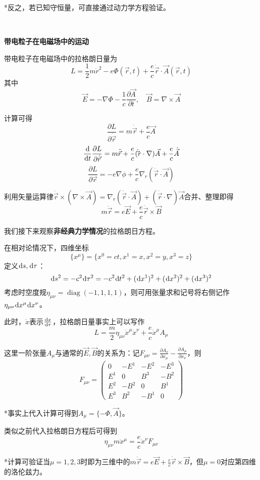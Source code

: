\documentclass[a4paper,UTF8,fontset=windows]{ctexart}
\newcommand*{\dr}{\hspace{0.07em}\mathrm{d}}
\DeclareMathOperator{\diag}{diag}
\begin{document}
*反之，若已知守恒量，可直接通过动力学方程验证。

\

\textbf{带电粒子在电磁场中的运动}

带电粒子在电磁场中的拉格朗日量为
$$L=\frac{1}{2}m\dot{r}^2-e\Phi(\vec{r},t)+\frac{e}{c}\dot{\vec{r}}\cdot\vec{A}(\vec{r},t)$$
其中
$$\vec{E}=-\nabla\Phi-\frac{1}{c}\frac{\partial\vec{A}}{\partial t},\quad\vec{B}=\nabla\times\vec{A}$$

计算可得
$$\frac{\partial L}{\partial\dot{\vec{r}}}=m\dot{\vec{r}}+\frac{e}{c}\vec{A}$$
$$\frac{\dr}{\dr t}\frac{\partial L}{\partial\dot{\vec{r}}}=m\ddot{\vec{r}}+\frac{e}{c}(\dot\vec{r}\cdot\nabla)\vec{A}+\frac{e}{c}\dot{\vec{A}}$$
$$\frac{\partial L}{\partial\vec{r}}=-e\nabla\phi+\frac{e}{c}\nabla_r(\dot{\vec{r}}\cdot\vec{A})$$

利用矢量运算律$\dot{\vec{r}}\times(\nabla\times\vec{A})=\nabla_r(\dot{\vec{r}}\cdot\vec{A})+(\dot{\vec{r}}\cdot\nabla)\vec{A}$合并、整理即得
$$m\ddot{\vec{r}}=e\vec{E}+\frac{e}{c}\dot{\vec{r}}\times\vec{B}$$

我们接下来观察\textbf{非经典力学情况}的拉格朗日方程。

在相对论情况下，四维坐标
$$\{x^\mu\}=\{x^0=ct,x^1=x,x^2=y,x^3=z\}$$
定义$\dr s,\dr\tau$：
$$\dr s^2=-c^2\dr\tau^2=-c^2\dr t^2+(\dr x^1)^2+(\dr x^2)^2+(\dr x^3)^2$$
考虑时空度规$\eta_{\mu\nu}=\diag(-1,1,1,1)$，则可用张量求和记号将右侧记作$\eta_{\mu\nu}\dr x^\mu\dr x^\nu$。

此时，$\dot{x}$表示$\frac{\dr x}{\dr\tau}$，拉格朗日量事实上可以写作
$$L=\frac{m}{2}\eta_{\mu\nu}\dot{x}^\mu\dot{x}^\nu+\frac{e}{c}\dot{x}^\mu A_\mu$$

这里一阶张量$A_\mu$与通常的$\vec{E},\vec{B}$的关系为：记$F_{\mu\nu}=\frac{\partial A_\nu}{\partial x_\mu}-\frac{\partial A_\mu}{\partial x_\nu}$，则
$$F_{\mu\nu}=\begin{pmatrix}0&-E^1&-E^2&-E^3\\E^1&0&B^3&-B^2\\E^2&-B^2&0&B^1\\E^3&B^2&-B^1&0\end{pmatrix}$$

*事实上代入计算可得到$A_\mu=\{-\Phi,\vec{A}\}$。

类似之前代入拉格朗日方程后可得到
$$\eta_{\mu\nu}m\ddot{x}^\mu=\frac{e}{c}\dot{x}^\nu F_{\mu\nu}$$

*计算可验证当$\mu=1,2,3$时即为三维中的$m\ddot{\vec{r}}=e\vec{E}+\frac{e}{c}\dot{\vec{r}}\times\vec{B}$，但$\mu=0$对应第四维的洛伦兹力。
\end{document}
